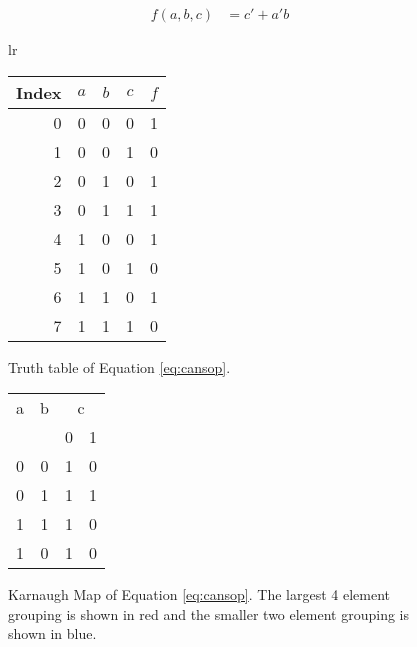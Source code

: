 \documentclass[12pt]{article}
\begin{document}
\begin{align}
f(a, b, c) &= c' + a'b \label{eq:simp}
\end{align}

\begin{figure}[!hbt]
\begin{center}

\begin{tabular}{lr}
  \begin{tabular}[t]{r|ccc|c}
Index&$a$&$b$&$c$&$f$\\
\hline
0 &0&0&0 &1\\
1 &0&0&1 &0\\
2 &0&1&0 &1\\
3 &0&1&1 &1\\
4 &1&0&0 &1\\
5 &1&0&1 &0\\
6 &1&1&0 &1\\
7 &1&1&1 &0\\
  \end{tabular}
\end{tabular}
\end{center}

\caption{Truth table of Equation \ref{eq:cansop}.}
\label{fig:tt}
\end{figure}

\begin{figure}[!hbt]
\begin{center}

\begin{tabular}{cc|c|c|}
a & b & \multicolumn{2}{c}{c} \\
& & \multicolumn{1}{c}{0} & \multicolumn{0}{c}{1} \\
\cline{3-4}
0 & 0  & \cellcolor{red!40}1 & 0 \\
\cline{3-4}
0 & 1  & \cellcolor{red!40!blue!40}1 & \cellcolor{blue!40}1 \\
\cline{3-4}
1 & 1  & \cellcolor{red!40}1 & 0 \\
\cline{3-4}
1 & 0  & \cellcolor{red!40}1 & 0 \\
\cline{3-4}
\end{tabular}


\end{center}
\caption{Karnaugh Map of Equation \ref{eq:cansop}.
The largest 4 element grouping is shown in red and the smaller
two element grouping is shown in blue.}
\label{fig:karnmap}
\end{figure}
\end{document}
